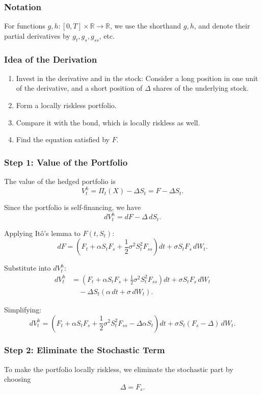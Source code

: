 \documentclass[12pt,a4paper]{article}
\theoremstyle{definition}
\newcommand{\R}{\mathbb{R}}
\begin{document}
\subsubsection*{Notation}
For functions $g, h: [0,T] \times \R \to \R$, we use the shorthand $g, h$, and denote their partial derivatives by $g_t, g_s, g_{ss}$, etc.

\subsubsection*{Idea of the Derivation}
\begin{enumerate}
\item Invest in the derivative and in the stock: Consider a long position in one unit of the derivative, and a short position of $\Delta$ shares of the underlying stock.
\item Form a locally riskless portfolio.
\item Compare it with the bond, which is locally riskless as well.
\item Find the equation satisfied by $F$.
\end{enumerate}

\subsubsection*{Step 1: Value of the Portfolio}
The value of the hedged portfolio is
\[
V_t^h = \Pi_t(X) - \Delta S_t = F - \Delta S_t.
\]

Since the portfolio is self-financing, we have
\[
dV_t^h = dF - \Delta \, dS_t.
\]

Applying Itô's lemma to $F(t, S_t)$:
\[
dF = \left(F_t + \alpha S_t F_s + \frac{1}{2}\sigma^2 S_t^2 F_{ss}\right) dt + \sigma S_t F_s \, dW_t.
\]

Substitute into $dV_t^h$:
\begin{align}
dV_t^h &= \left(F_t + \alpha S_t F_s + \frac{1}{2}\sigma^2 S_t^2 F_{ss}\right) dt + \sigma S_t F_s \, dW_t \\
&\quad - \Delta S_t (\alpha \, dt + \sigma \, dW_t).
\end{align}

Simplifying:
\[
dV_t^h = \left(F_t + \alpha S_t F_s + \frac{1}{2}\sigma^2 S_t^2 F_{ss} - \Delta \alpha S_t\right) dt + \sigma S_t (F_s - \Delta) \, dW_t.
\]

\subsubsection*{Step 2: Eliminate the Stochastic Term}
To make the portfolio locally riskless, we eliminate the stochastic part by choosing
\[
\Delta = F_s.
\]
\end{document}
